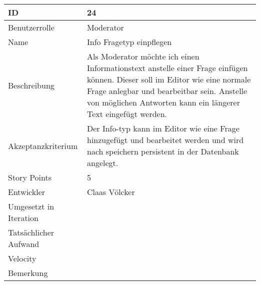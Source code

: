 \begin{tabularx}{\textwidth}{|p{}|X|}
	\hline
	ID & 24 \\
	\hline
	Benutzerrolle & Moderator \\
	\hline
	Name & Info Fragetyp einpflegen\\
	\hline
	Beschreibung & Als Moderator möchte ich einen Informationstext anstelle einer Frage einfügen können.
		Dieser soll im Editor wie eine normale Frage anlegbar und bearbeitbar sein.
		Anstelle von möglichen Antworten kann ein längerer Text eingefügt werden.\\
	\hline
	Akzeptanzkriterium & Der Info-typ kann im Editor wie eine Frage hinzugefügt und bearbeitet werden und wird nach speichern persistent in der Datenbank angelegt. \\
	\hline
	Story Points & 5 \\
	\hline
	Entwickler & Claas Völcker\\
	\hline
	Umgesetzt in Iteration & \\ 
	\hline
	Tatsächlicher Aufwand & \\
	\hline
	Velocity & \\
	\hline
	Bemerkung & \\
	\hline
\end{tabularx}
\vspace{20pt}

